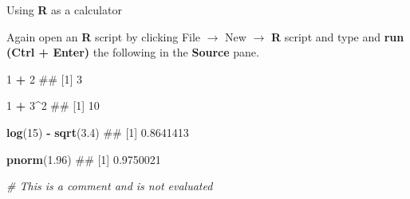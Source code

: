 \documentclass[ignorenonframetext,]{beamer}
\newenvironment{Shaded}{\begin{snugshade}}{\end{snugshade}}
\newcommand{\KeywordTok}[1]{\textcolor[rgb]{0.13,0.29,0.53}{\textbf{#1}}}
\newcommand{\DecValTok}[1]{\textcolor[rgb]{0.00,0.00,0.81}{#1}}
\newcommand{\FloatTok}[1]{\textcolor[rgb]{0.00,0.00,0.81}{#1}}
\newcommand{\StringTok}[1]{\textcolor[rgb]{0.31,0.60,0.02}{#1}}
\newcommand{\CommentTok}[1]{\textcolor[rgb]{0.56,0.35,0.01}{\textit{#1}}}
\newcommand{\OperatorTok}[1]{\textcolor[rgb]{0.81,0.36,0.00}{\textbf{#1}}}
\newcommand{\NormalTok}[1]{#1}
\let\oldShaded\Shaded
\let\endoldShaded\endShaded
\renewenvironment{Shaded}{\footnotesize\oldShaded}{\endoldShaded}
\begin{document}
\begin{frame}[fragile]{Using \textbf{R} as a calculator}

Again open an \textbf{R} script by clicking File \(\rightarrow\) New
\(\rightarrow\) \textbf{R} script and type and \textbf{run (Ctrl +
Enter)} the following in the \textbf{Source} pane.

\begin{Shaded}
\begin{Highlighting}[]
\DecValTok{1} \OperatorTok{+}\StringTok{ }\DecValTok{2}
\NormalTok{## [1] 3}

\DecValTok{1} \OperatorTok{+}\StringTok{ }\DecValTok{3}\OperatorTok{^}\DecValTok{2}
\NormalTok{## [1] 10}

\KeywordTok{log}\NormalTok{(}\DecValTok{15}\NormalTok{) }\OperatorTok{-}\StringTok{ }\KeywordTok{sqrt}\NormalTok{(}\FloatTok{3.4}\NormalTok{)}
\NormalTok{## [1] 0.8641413}

\KeywordTok{pnorm}\NormalTok{(}\FloatTok{1.96}\NormalTok{)}
\NormalTok{## [1] 0.9750021}

\CommentTok{# This is a comment and is not evaluated}
\end{Highlighting}
\end{Shaded}

\end{frame}
\end{document}
